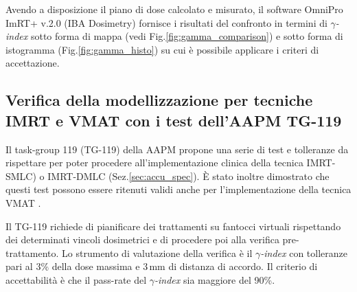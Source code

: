 Avendo a disposizione il piano di dose calcolato e misurato, il software OmniPro ImRT+ v.2.0 (IBA Dosimetry) fornisce i risultati del confronto in termini di $\gamma$\textit{-index} sotto forma di mappa (vedi Fig.\ref{fig:gamma_comparison}) e sotto forma di istogramma (Fig.\ref{fig:gamma_histo}) su cui è possibile applicare i criteri di accettazione.

\subsection{Verifica della modellizzazione per tecniche IMRT e VMAT con i test dell'AAPM TG-119}

Il task-group 119 (TG-119) della AAPM \cite{Ezzell2009} propone una serie di test e tolleranze da rispettare per poter procedere all'implementazione clinica della tecnica IMRT-SMLC) o IMRT-DMLC (Sez.\ref{sec:accu_spec}). \`E stato inoltre dimostrato che questi test possono essere ritenuti validi anche per l'implementazione della tecnica VMAT \cite{Mynampati2012}.

Il TG-119 richiede di pianificare dei trattamenti su fantocci virtuali rispettando dei determinati vincoli dosimetrici e di procedere poi alla verifica pre-trattamento. Lo strumento di valutazione della verifica è il $\gamma$\textit{-index} con tolleranze pari al 3\% della dose massima e $3\,$mm di distanza di accordo. Il criterio di accettabilità è che il pass-rate del $\gamma$\textit{-index} sia maggiore del 90\%.


